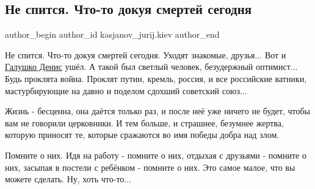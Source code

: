  
 
 
 
 

\subsection{Не спится. Что-то докуя смертей сегодня}
\label{sec:09_01_2023.fb.kasjanov_jurij.kiev.1.ne_spitsya__chto_to_}

\ifcmt
 author_begin
   author_id kasjanov_jurij.kiev
 author_end
\fi

Не спится. Что-то докуя смертей сегодня. Уходят знакомые, друзья... Вот и
\href{https://www.facebook.com/HalushkoDenis}{Галушко Денис} ушёл. А такой был
светлый человек, безудержный оптимист... Будь проклята война. Проклят путин,
кремль, россия, и все российские ватники, мастурбирующие на давно и поделом
сдохший советский союз... 

Жизнь - бесценна, она даётся только раз, и после неё уже ничего не будет, чтобы
вам не говорили церковники. И тем больше, и страшнее, безумнее жертва, которую
приносят те, которые сражаются во имя победы добра над злом.

Помните о них. Идя на работу - помните о них, отдыхая с друзьями - помните о
них,  засыпая в постели с ребёнком - помните о них. Это самое малое, что вы
можете сделать. Ну, хоть что-то...

